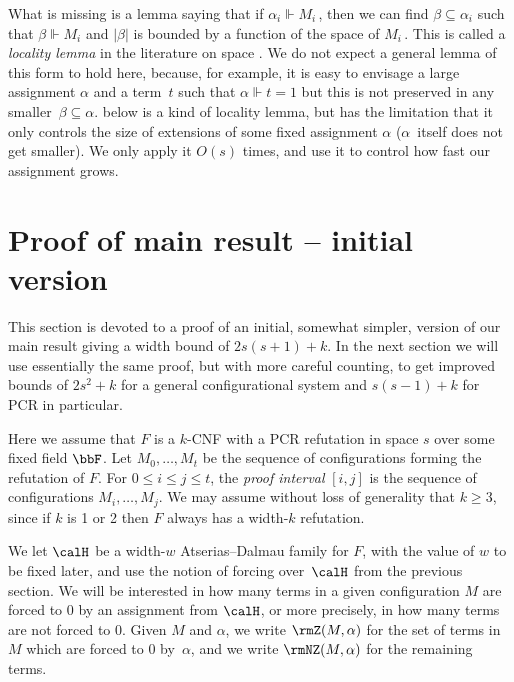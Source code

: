 \documentclass{toc}
\begin{document}
What is missing is a lemma saying that 
if $\alpha_i \Vdash M_i$\,, then we can find $\beta \subseteq \alpha_i$
such that $\beta \Vdash M_i$ and $|\beta|$ is bounded by a  
function of the space of $M_i$\,.
This is called a \emph{locality lemma} in the literature on space
\cite{ABRW,DBLP:journals/rsa/Ben-SassonG03,DBLP:journals/jacm/BonacinaG15}.
We do not expect a general lemma of this form to hold here,
because, for example, it is easy to envisage a large assignment
$\alpha$ and a term~$t$ such that $\alpha \Vdash t=1$
but this is not preserved in any smaller~$\beta \subseteq \alpha$.
 below is a kind of locality lemma, but has
the limitation that it only controls the size of extensions of some fixed
assignment $\alpha$ ($\alpha$~itself does not get smaller). 
We only apply it $O(s)$ times, and use it to control how fast our assignment grows.

%
\section{Proof of main result -- initial version} \label{sec:main}\label{sec:upanddown}
%

This section is devoted to a proof of an initial, somewhat simpler, version of our main result
giving a width bound of $2s(s+1)+k$.
In the next section we will use essentially the same proof,
but with more careful counting, to get improved bounds
of $2s^2+k$ for a general configurational system
and $s(s-1)+k$ for PCR in particular.


Here we assume that $F$ is a $k$-CNF 
with a PCR refutation in space $s$ over
some fixed field $\bbF$. 
Let $M_0, \ldots, M_t$ be the sequence of configurations
forming the refutation of $F$. For $0 \le i \le j \le t$,
the \emph{proof interval} $[i,j]$ is the sequence of configurations $M_i, \ldots, M_j$.
We may assume without loss of generality that $k \ge 3$, since if $k$ is 1 or 2
then $F$ always has a width-$k$ refutation. 

We let $\calH$ be a width-$w$ Atserias--Dalmau family for $F$,
with the value of $w$ to be fixed later,
 and  use the notion of forcing over~$\calH$ from
the previous section.
We will be interested in how many terms in a given configuration
$M$ are forced to $0$ by an assignment from $\calH$, 
or more precisely, in how many terms are not forced to $0$. 
Given $M$ and $\alpha$, 
we write $\rmZ(M, \alpha)$ for the set of terms in $M$ which 
are forced to $0$ by~$\alpha$, and we write $\rmNZ(M, \alpha)$
for the remaining terms.
\end{document}
